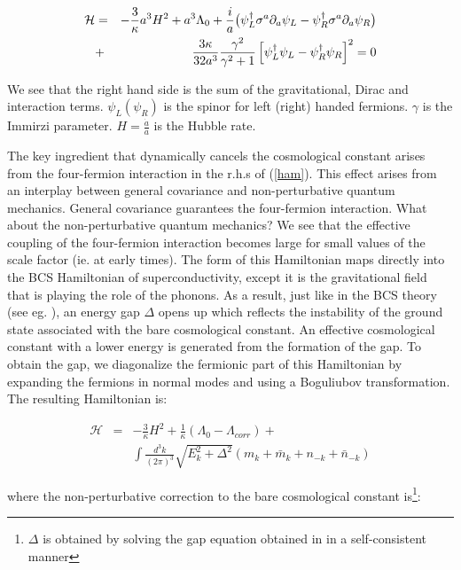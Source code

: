 \begin{doublespace}
\begin{eqnarray}
\label{ham}
    {\cal H} &=& -\frac{3}{\kappa}a^3H^2 +
    a^3\Lambda_0 + \frac{i}{a}\big(\psi_L^\dag\sigma^a\partial_a\psi_L - \psi_R^\dag\sigma^a\partial_a\psi_R\big) \nonumber \\
    &+& \frac{3\kappa}{32a^3}\frac{\gamma^2}{\gamma^2+1}\left[\psi_L^\dag\psi_L - \psi_R^\dag\psi_R\right]^2 = 0
\end{eqnarray}

We see that the right hand side is the sum of the gravitational,
Dirac and interaction terms. $\psi_L (\psi_R)$ is the spinor for
left (right) handed fermions. $\gamma$ is the Immirzi parameter. $H
= \frac{\dot a}{a}$ is the Hubble rate.

The key ingredient that dynamically cancels the cosmological
constant arises from the four-fermion interaction in the r.h.s of
(\ref{ham}).  This effect arises from an interplay between general
covariance and non-perturbative quantum mechanics.  General
covariance guarantees the four-fermion interaction.  What about the
non-perturbative quantum mechanics?  We see that the effective
coupling of the four-fermion interaction becomes large for small
values of the scale factor (ie. at early times).  The form of this
Hamiltonian maps directly into the BCS Hamiltonian of
superconductivity, except it is the gravitational field that is
playing the role of the phonons. As a result, just like in the BCS
theory (see eg. \cite{Fetter2003Quantum}), an energy gap $\Delta$ opens
up which reflects the instability of the ground state associated
with the bare cosmological constant.  An effective cosmological
constant with a lower energy is generated from the formation of the
gap.  To obtain the gap, we diagonalize the fermionic part of this
Hamiltonian by expanding the fermions in normal modes and using a
Boguliubov transformation. The resulting Hamiltonian is:

\begin{eqnarray}
\mathcal{H} &=& -\frac{3}{\kappa}H^2 + \frac{1}{\kappa}(\Lambda_0 -
\Lambda_{corr})
        + \nonumber \\
         && \int \frac{d^3k}{(2\pi)^3} \sqrt{E_k^2 + \Delta^2}(m_k + \bar m_k + n_{-k} + \bar
        n_{-k})
\end{eqnarray}

where the non-perturbative correction to the bare cosmological
constant is\footnote{$\Delta$ is obtained by solving the gap
equation obtained in \cite{Alexander2006Gravity} in a self-consistent
manner}:


\end{doublespace}
